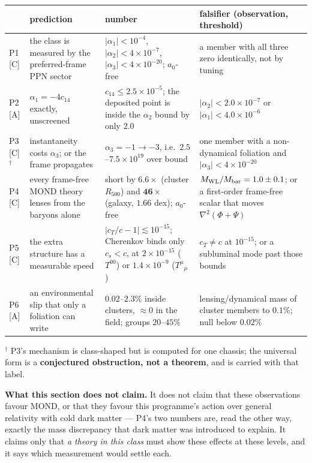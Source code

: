\documentclass[11pt,letterpaper]{article}
\begin{document}
\begin{center}\footnotesize\setlength{\tabcolsep}{4pt}
\begin{tabular}{L{0.045\textwidth}L{0.235\textwidth}L{0.31\textwidth}L{0.30\textwidth}}\toprule
 & prediction & number & falsifier (observation, threshold)\\\midrule
P1 [C] & the class is measured by the preferred-frame PPN sector & $|\alpha_1|<10^{-4}$, $|\alpha_2|<4\times10^{-7}$, $|\alpha_3|<4\times10^{-20}$; $a_0$-free & a member with all three zero identically, not by tuning\\
P2 [A] & $\alpha_1=-4c_{14}$ exactly, unscreened & $c_{14}\le2.5\times10^{-5}$; the deposited point is inside the $\alpha_2$ bound by only $2.0$ & $|\alpha_2|<2.0\times10^{-7}$ or $|\alpha_1|<4.0\times10^{-6}$\\
P3 [C]$^\dagger$ & instantaneity costs $\alpha_3$; or the frame propagates & $\alpha_3=-1\to-3$, i.e.\ $2.5$--$7.5\times10^{19}$ over bound & one member with a non-dynamical foliation and $|\alpha_3|<4\times10^{-20}$\\
P4 [C] & every frame-free MOND theory lenses from the baryons alone & short by $\mathbf{6.6\times}$ (cluster $R_{500}$) and $\mathbf{46\times}$ (galaxy, $1.66$ dex); $a_0$-free & $M_{\rm WL}/M_{\rm bar}=1.0\pm0.1$; or a first-order frame-free scalar that moves $\nabla^2(\Phi+\Psi)$\\
P5 [C] & the extra structure has a measurable speed & $|c_T/c-1|\lesssim10^{-15}$; Cherenkov binds only $c_s<c$, at $2\times10^{-15}$ ($T^{00}$) or $1.4\times10^{-9}$ ($T^\mu{}_\mu$) & $c_T\neq c$ at $10^{-15}$; or a subluminal mode past those bounds\\
P6 [A] & an environmental slip that only a foliation can write & $0.02$--$2.3\%$ inside clusters, $\approx0$ in the field; groups $20$--$45\%$ & lensing/dynamical mass of cluster members to $0.1\%$; null below $0.02\%$\\\bottomrule
\end{tabular}
\end{center}
$^\dagger$ P3's mechanism is class-shaped but is computed for one chassis; the universal form is a \textbf{conjectured obstruction, not a theorem}, and is carried with that label.

\textbf{What this section does not claim.} It does not claim that these observations favour MOND, or that they favour this programme's action over general relativity with cold dark matter --- P4's two numbers are, read the other way, exactly the mass discrepancy that dark matter was introduced to explain. It claims only that \emph{a theory in this class} must show these effects at these levels, and it says which measurement would settle each.
\end{document}
